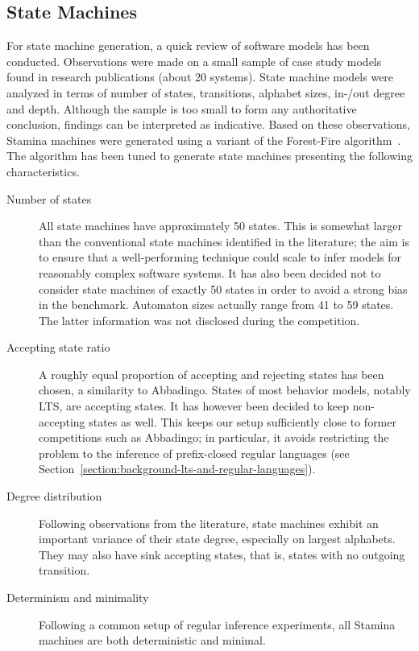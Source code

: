 \subsection{State Machines\label{subsection:stamina-machines}}

For state machine generation, a quick review of software models has been conducted. Observations were made on a small sample of case study models found in research publications (about 20 systems). State machine models were analyzed in terms of number of states, transitions, alphabet sizes, in-/out degree and depth. Although the sample is too small to form any authoritative conclusion, findings can be interpreted as indicative. Based on these observations, Stamina machines were generated using a variant of the Forest-Fire algorithm~\cite{Leskovec2007}. The algorithm has been tuned to generate state machines presenting the following characteristics.
\begin{description}

\item[Number of states] All state machines have approximately 50 states. This is somewhat larger than the conventional state machines identified in the literature; the aim is to ensure that a well-performing technique could scale to infer models for reasonably complex software systems. It has also been decided not to consider state machines of exactly 50 states in order to avoid a strong bias in the benchmark. Automaton sizes actually range from 41 to 59 states. The latter information was not disclosed during the competition.

\item[Accepting state ratio] A roughly equal proportion of accepting and rejecting states has been chosen, a similarity to Abbadingo. States of most behavior models, notably LTS, are accepting states. It has however been decided to keep non-accepting states as well. This keeps our setup sufficiently close to former competitions such as Abbadingo; in particular, it avoids restricting the problem to the inference of prefix-closed regular languages (see Section~\ref{section:background-lts-and-regular-languages}).

\item[Degree distribution] Following observations from the literature, state machines exhibit an important variance of their state degree, especially on largest alphabets. They may also have sink accepting states, that is, states with no outgoing transition.

\item[Determinism and minimality] Following a common setup of regular inference experiments, all Stamina machines are both deterministic and minimal.

\end{description}

